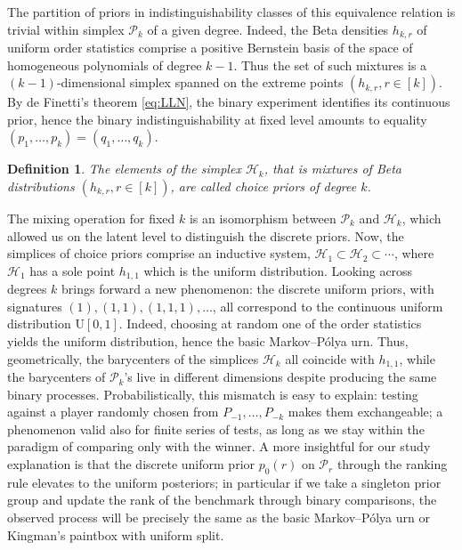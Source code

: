 \documentclass[10pt,a4paper]{amsart}
\newtheorem{definition}[theorem]{Definition}
\numberwithin{equation}{section}
\begin{document}
The partition of priors in indistinguishability classes of this equivalence relation is trivial within simplex \(\mathcal{P}_k\) of a given degree. Indeed, the Beta densities \(h_{k,r}\) of uniform order statistics comprise a positive Bernstein basis of the space of homogeneous polynomials of degree \(k-1\). Thus the set of such mixtures is a \((k-1)\)-dimensional simplex spanned on the extreme points \((h_{k,r},r\in[k])\). By de Finetti's theorem \eqref{eq:LLN}, the binary experiment identifies its continuous prior, hence the binary indistinguishability at fixed level amounts to equality \((p_1,\dots,p_k)=(q_1,\dots,q_k)\).

\begin{definition}
The elements of the simplex \(\mathcal{H}_k\), that is mixtures of Beta distributions \((h_{k,r},r\in[k])\), are called choice priors of degree \(k\).
\end{definition}

The mixing operation for fixed \(k\) is an isomorphism between \(\mathcal{P}_k\) and \(\mathcal{H}_k\), which allowed us on the latent level to distinguish the discrete priors. Now, the simplices of choice priors comprise an inductive system, \(\mathcal{H}_1\subset\mathcal{H}_2\subset\cdots\), where \(\mathcal{H}_1\) has a sole point \(h_{1,1}\) which is the uniform distribution. Looking across degrees \(k\) brings forward a new phenomenon: the discrete uniform priors, with signatures \((1),(1,1),(1,1,1),\dots\), all correspond to the continuous uniform distribution \(\mathrm{U}[0,1]\). Indeed, choosing at random one of the order statistics yields the uniform distribution, hence the basic Markov--P\'olya urn. Thus, geometrically, the barycenters of the simplices \(\mathcal{H}_k\) all coincide with \(h_{1,1}\), while the barycenters of \(\mathcal{P}_k\)'s live in different dimensions despite producing the same binary processes. Probabilistically, this mismatch is easy to explain: testing against a player randomly chosen from \(P_{-1},\dots,P_{-k}\) makes them exchangeable; a phenomenon valid also for finite series of tests, as long as we stay within the paradigm of comparing only with the winner. A more insightful for our study explanation is that the discrete uniform prior \(p_0(r)\) on \(\mathcal{P}_r\) through the ranking rule elevates to the uniform posteriors; in particular if we take a singleton prior group and update the rank of the benchmark through binary comparisons, the observed process will be precisely the same as the basic Markov--P\'olya urn or Kingman's paintbox with uniform split.
\end{document}
